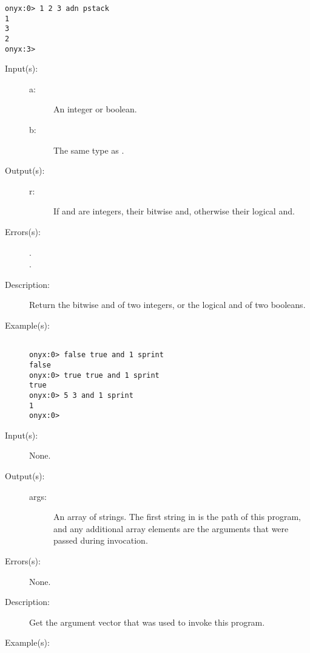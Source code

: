 \begin{description}
\begin{description}
\begin{verbatim}
onyx:0> 1 2 3 adn pstack
1
3
2
onyx:3>
		\end{verbatim}
	\end{description}
\label{systemdict:and}
\item[{\onyxop{a b}{and}{r}}: ]
	\begin{description}\item[]
	\item[Input(s): ]
		\begin{description}\item[]
		\item[a: ]
			An integer or boolean.
		\item[b: ]
			The same type as .
		\end{description}
	\item[Output(s): ]
		\begin{description}\item[]
		\item[r: ]
			If  and  are integers, their bitwise
			and, otherwise their logical and.
		\end{description}
	\item[Errors(s): ]
		\begin{description}\item[]
		\item[.]
		\item[.]
		\end{description}
	\item[Description: ]
		Return the bitwise and of two integers, or the logical and of
		two booleans.
	\item[Example(s): ]\begin{verbatim}

onyx:0> false true and 1 sprint
false
onyx:0> true true and 1 sprint
true
onyx:0> 5 3 and 1 sprint
1
onyx:0>
		\end{verbatim}
	\end{description}
\label{systemdict:argv}
\item[{\onyxop{--}{argv}{args}}: ]
	\begin{description}\item[]
	\item[Input(s): ] None.
	\item[Output(s): ]
		\begin{description}\item[]
		\item[args: ]
			An array of strings.  The first string in 
			is the path of this program, and any additional
			array elements are the arguments that were passed during
			invocation.
		\end{description}
	\item[Errors(s): ] None.
	\item[Description: ]
		Get the argument vector that was used to invoke this program.
	\item[Example(s): ]\begin{verbatim}


\end{verbatim}
\end{description}
\end{description}
